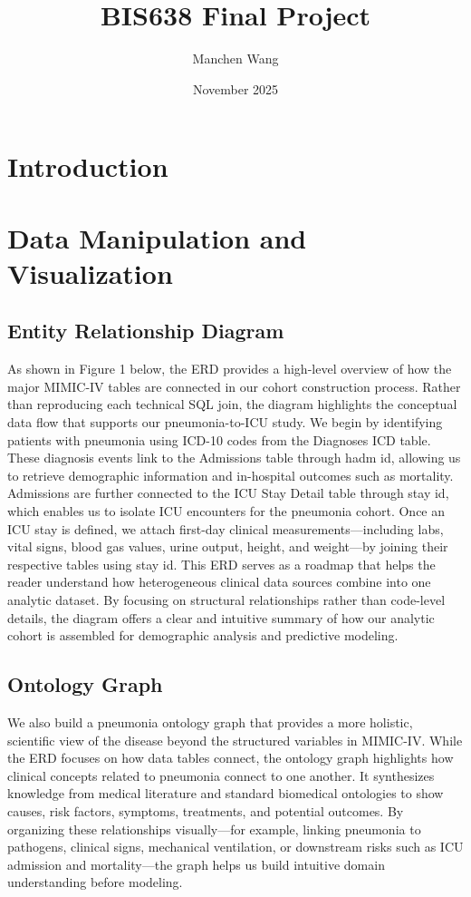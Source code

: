 \documentclass[10pt,a4paper]{article}
\title{BIS638 Final Project}
\author{Manchen Wang}
\date{November 2025}
\begin{document}
\doublespacing
\maketitle

\section{Introduction}

\section{Data Manipulation and Visualization}
\subsection{Entity Relationship Diagram}

As shown in Figure 1 below, the ERD provides a high-level overview of how the major MIMIC-IV tables are connected in our cohort construction process. Rather than reproducing each technical SQL join, the diagram highlights the conceptual data flow that supports our pneumonia-to-ICU study. We begin by identifying patients with pneumonia using ICD-10 codes from the Diagnoses ICD table. These diagnosis events link to the Admissions table through hadm id, allowing us to retrieve demographic information and in-hospital outcomes such as mortality. Admissions are further connected to the ICU Stay Detail table through stay id, which enables us to isolate ICU encounters for the pneumonia cohort. Once an ICU stay is defined, we attach first-day clinical measurements—including labs, vital signs, blood gas values, urine output, height, and weight—by joining their respective tables using stay id.
This ERD serves as a roadmap that helps the reader understand how heterogeneous clinical data sources combine into one analytic dataset. By focusing on structural relationships rather than code-level details, the diagram offers a clear and intuitive summary of how our analytic cohort is assembled for demographic analysis and predictive modeling.


\subsection{ Ontology Graph}

We also build a pneumonia ontology graph that provides a more holistic, scientific view of the disease beyond the structured variables in MIMIC-IV. While the ERD focuses on how data tables connect, the ontology graph highlights how clinical concepts related to pneumonia connect to one another. It synthesizes knowledge from medical literature and standard biomedical ontologies to show causes, risk factors, symptoms, treatments, and potential outcomes. By organizing these relationships visually—for example, linking pneumonia to pathogens, clinical signs, mechanical ventilation, or downstream risks such as ICU admission and mortality—the graph helps us build intuitive domain understanding before modeling.
\end{document}
